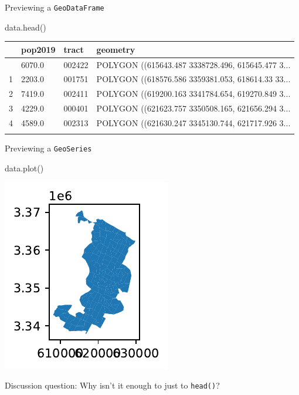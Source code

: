 \documentclass[
  ignorenonframetext,
]{beamer}
\newenvironment{Shaded}{\begin{snugshade}}{\end{snugshade}}
\newcommand{\NormalTok}[1]{\textcolor[rgb]{0.00,0.23,0.31}{#1}}
\begin{document}
\begin{frame}[fragile]{Previewing a \texttt{GeoDataFrame}}
\label{previewing-a-geodataframe}
\scriptsize

\begin{Shaded}
\begin{Highlighting}[]
\NormalTok{data.head()}
\end{Highlighting}
\end{Shaded}

\begin{longtable}[]{@{}llll@{}}
\toprule\noalign{}
& pop2019 & tract & geometry \\
\midrule\noalign{}
\endhead
0 & 6070.0 & 002422 & POLYGON ((615643.487 3338728.496, 615645.477
3... \\
1 & 2203.0 & 001751 & POLYGON ((618576.586 3359381.053, 618614.33
33... \\
2 & 7419.0 & 002411 & POLYGON ((619200.163 3341784.654, 619270.849
3... \\
3 & 4229.0 & 000401 & POLYGON ((621623.757 3350508.165, 621656.294
3... \\
4 & 4589.0 & 002313 & POLYGON ((621630.247 3345130.744, 621717.926
3... \\
\bottomrule\noalign{}
\end{longtable}

\normalsize
\end{frame}

\begin{frame}[fragile]{Previewing a \texttt{GeoSeries}}
\label{previewing-a-geoseries}
\begin{Shaded}
\begin{Highlighting}[]
\NormalTok{data.plot()}
\end{Highlighting}
\end{Shaded}

\includegraphics{spatial_2_files/figure-beamer/cell-6-output-1.pdf}

Discussion question: Why isn't it enough to just to \texttt{head()}?
\end{frame}
\end{document}
